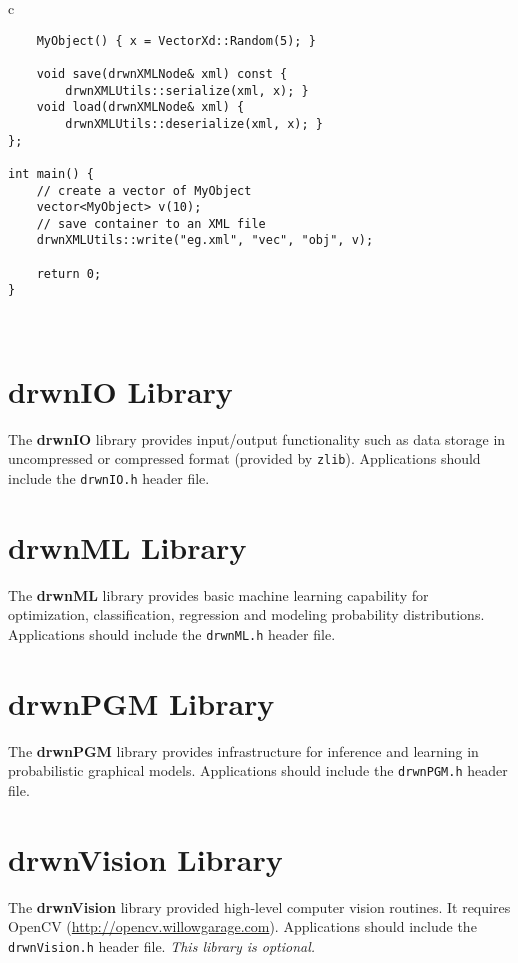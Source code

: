 \documentclass[landscape,8pt]{article}
\newcommand{\thickhline}{\noalign{\hrule height 0.8pt}}
\begin{document}
\begin{multicols}{3}
\begin{tabular}{c}
\begin{minipage}[h]{0.95\columnwidth}
\begin{verbatim}
    MyObject() { x = VectorXd::Random(5); }

    void save(drwnXMLNode& xml) const { 
        drwnXMLUtils::serialize(xml, x); }
    void load(drwnXMLNode& xml) {
        drwnXMLUtils::deserialize(xml, x); }
};

int main() {
    // create a vector of MyObject
    vector<MyObject> v(10);
    // save container to an XML file
    drwnXMLUtils::write("eg.xml", "vec", "obj", v);

    return 0;
}
\end{verbatim}
\smallskip
\end{minipage}\\
\thickhline
\end{tabular}
\smallskip

\section*{drwnIO Library}

The {\bf drwnIO} library provides input/output functionality such as
data storage in uncompressed or compressed format (provided by
\texttt{zlib}). Applications should include the \texttt{drwnIO.h}
header file.

\section*{drwnML Library}

The {\bf drwnML} library provides basic machine learning capability
for optimization, classification, regression and modeling probability
distributions. Applications should include the \texttt{drwnML.h}
header file.

\section*{drwnPGM Library}

The {\bf drwnPGM} library provides infrastructure for inference and
learning in probabilistic graphical models. Applications should
include the \texttt{drwnPGM.h} header file.

\section*{drwnVision Library}

The {\bf drwnVision} library provided high-level computer vision
routines. It requires OpenCV (\url{http://opencv.willowgarage.com}).
Applications should include the \texttt{drwnVision.h} header
file. \emph{This library is optional.}

\end{multicols}
\end{document}
